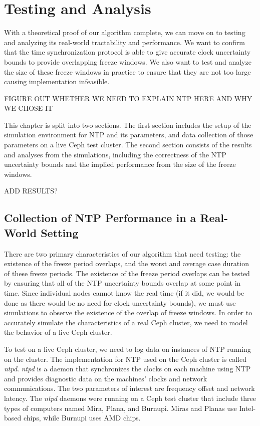 \chapter{Testing and Analysis}
\label{sec:results}

With a theoretical proof of our algorithm complete, we can move on to
testing and analyzing its real-world tractability and performance. We want to
confirm that the time synchronization protocol is able to give accurate clock
uncertainty bounds to provide overlapping freeze windows. We also
want to test and analyze the size of these freeze windows in practice
to ensure that they are not too large causing implementation infeasible.

FIGURE OUT WHETHER WE NEED TO EXPLAIN NTP HERE AND WHY WE CHOSE IT

This chapter is split into two sections. The first section includes
the setup of the simulation environment for NTP and its parameters,
and data collection of those parameters on a live Ceph test cluster.
The second section consists of the results and analyses from the simulations,
including the correctness of the NTP uncertainty bounds and the implied
performance from the size of the freeze windows.

ADD RESULTS?



\section{Collection of NTP Performance in a Real-World Setting}

There are two primary characteristics of our algorithm that need
testing: the existence of the freeze period overlaps, and the 
worst and average case duration of these freeze periods. 
The existence of the freeze period overlaps can be tested by 
ensuring that all of the NTP uncertainty bounds overlap at some 
point in time. Since individual nodes cannot know the real time
(if it did, we would be done as there would be no need for clock uncertainty
bounds), we must use simulations to observe the existence of 
the overlap of freeze windows. In order to accurately simulate the
characteristics of a real Ceph cluster, we need to model the
behavior of a live Ceph cluster.

To test on a live Ceph cluster, we need to log data on 
instances of NTP running on the cluster. The implementation for NTP 
used on the Ceph cluster is called \textit{ntpd}. \textit{ntpd} is a
daemon that synchronizes the clocks on each machine using NTP and
provides diagnostic data on the machines' clocks and network 
communications. The two parameters of interest are frequency offset and
network latency. The \textit{ntpd} daemons were running on a Ceph
test cluster that include three types of computers named Mira,
Plana, and Burnupi. Miras and Planas use Intel-based chips, while
Burnupi uses AMD chips.


